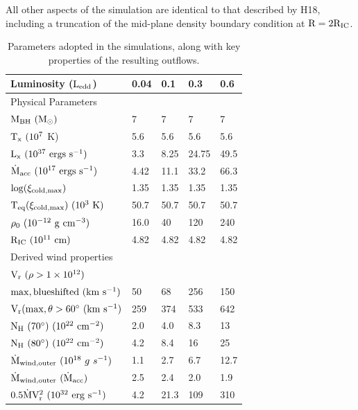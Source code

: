 \documentclass[a4paper,fleqn,usenatbib]{mnras}
\begin{document}
All other aspects of the simulation are identical to that described by H18, including a truncation of the 
mid-plane density boundary condition at $\rm{R=2 R_{IC}}$.

\begin{table}
\begin{tabular}{p{3.0cm}p{0.8cm}p{0.8cm}p{0.8cm}p{0.8cm}}
\hline 
Luminosity ($\rm{L_{edd}}$) & 0.04 & 0.1 & 0.3 & 0.6 \\ 
\hline 
\hline Physical Parameters & & & \\ \hline
$\rm{M_{BH}~(M_{\odot})}$  & 7 & 7 & 7 &7\\
$\rm{T_x~(10^7~}$K)  & 5.6 & 5.6 & 5.6  & 5.6\\
$\rm{L_x~(10^{37}}~\rm{ergs~s^{-1}})$&  3.3& 8.25 &  24.75 &49.5\\
$\dot{\rm{M}}_{\rm{acc}}~(10^{17}~\rm{ergs~s^{-1}})$&  4.42 & 11.1 &  33.2 &66.3\\
$\rm{\log(\xi_{cold,max})}$&   1.35 & 1.35 & 1.35 & 1.35 \\
$\rm{T_{eq}(\xi_{cold,max})~(10^3~K)}$ &  50.7 &  50.7 & 50.7 & 50.7 \\
$\rm{\rho_0~(10^{-12}~g~cm^{-3})}$  & 16.0 & 40 & 120 & 240 \\
$\rm{R_{IC}~(10^{11}~cm)}$  & 4.82 & 4.82 & 4.82 & 4.82 \\
\hline
\multicolumn{4}{l}{Derived wind properties}\\
\hline 
\multicolumn{4}{l}{$\rm{V_r~(\rho>1\times10^{12})}$}  \\
$\rm{max,blueshifted~({km~s^{-1}})}$ &  50 & 68 & 256  & 150  \\
$\rm{V_r(max,\theta>60\degree~({km~s^{-1}})}$ &  259   & 374 & 533    & 642 \\
$\rm{N_H~(70\degree)~(10^{22}}~\rm{cm^{-2})}$ & 2.0 & 4.0 &  8.3 & 13 \\
$\rm{N_H~(80\degree)~(10^{22}}~\rm{cm^{-2})}$  & 4.2 & 8.4 & 16 & 25 \\
${\dot{\rm{M}}_{\rm{wind,outer}}~(10^{18}~g~s^{-1}})$  &  1.1 & 2.7 &  6.7  & 12.7 \\
${\dot{\rm{M}}_{\rm{wind,outer}}~(\dot{\rm{M}}_{\rm{acc}})}$  & 2.5 & 2.4 & 2.0 & 1.9  \\
${0.5\dot{\rm{M}}\rm{V_r^2}~(10^{32}}~\rm{erg~s^{-1}})$  &  4.2 & 21.3 &   109 & 310  \\


\hline
\end{tabular}
\caption{Parameters adopted in the simulations, along with key properties of the resulting outflows.}
\label{table:wind_param}
\end{table}
\end{document}
